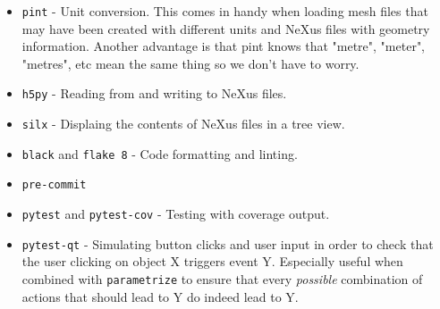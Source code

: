 \begin{itemize}
\item \texttt{pint} - Unit conversion. This comes in handy when loading mesh files that may have been created with different units and NeXus files with geometry information. Another advantage is that pint knows that "metre", "meter", "metres", etc mean the same thing so we don't have to worry.
\item \texttt{h5py} - Reading from and writing to NeXus files.
\item \texttt{silx} - Displaing the contents of NeXus files in a tree view.
\end{itemize}

\begin{itemize}
\item \texttt{black} and \texttt{flake 8} - Code formatting and linting.
\item \texttt{pre-commit}
\item \texttt{pytest} and \texttt{pytest-cov} - Testing with coverage output.
\item \texttt{pytest-qt} - Simulating button clicks and user input in order to check that the user clicking on object X triggers event Y. Especially useful when combined with \texttt{parametrize} to ensure that every \textit{possible} combination of actions that should lead to Y do indeed lead to Y.
\end{itemize}
